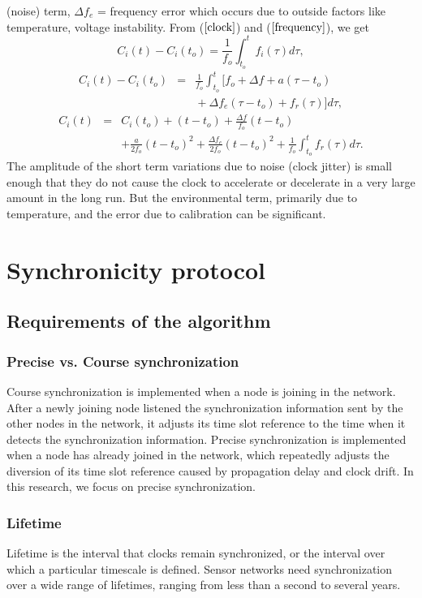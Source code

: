 \documentclass[journal]{IEEEtran}
\begin{document}
(noise) term, \newline $\Delta f_e$ = frequency error which occurs
due to outside factors like temperature, voltage instability. \newline
From ($\ref{clock}$) and
($\ref{frequency}$), we get
\begin{equation}
C_i(t) - C_i(t_o) = \frac{1}{f_o} \int^{t}_{t_o}f_i(\tau)d\tau ,
\end{equation}
\begin{eqnarray*}
C_i(t) - C_i(t_o) & = & \frac{1}{f_o} \int^{t}_{t_o}{[f_o + \Delta f + a(\tau-t_o)  } \\
 &  & {} + \Delta f_e(\tau-t_o) + f_r(\tau)]d\tau ,
\label{fasika}
\end{eqnarray*}
\begin{eqnarray*}
C_i(t) & = & C_i(t_o) + (t-t_o) +\frac{\Delta f}{f_o}(t-t_o) \\
& & + \frac{a}{2f_o}(t-t_o)^2 + \frac{\Delta f_e}{2f_o}(t-t_o)^2 +
\frac{1}{f_o}\int^{t}_{t_o}{f_r(\tau)d\tau} .
\end{eqnarray*}
The amplitude of the short term variations due to noise (clock
jitter) is small enough that they do not cause the clock to
accelerate or decelerate in a very large amount in the long run. But
the environmental term, primarily due to temperature, and the error
due to calibration can be significant. 
\section{\textbf{Synchronicity protocol}}
\subsection{\textbf{Requirements of the algorithm}}
\subsubsection{\textbf{Precise vs. Course synchronization}}Course synchronization
is implemented when a node is joining in the network. After a newly joining node listened the synchronization information sent by 
the other nodes in the network, it adjusts its time slot reference to the time when it detects the synchronization information. Precise synchronization is implemented when a node has already joined in the network, which repeatedly adjusts the diversion of its time slot reference caused by propagation delay and clock drift. In this research, we focus on precise synchronization.
\subsubsection{\textbf{Lifetime}} Lifetime is the interval that clocks
remain synchronized, or the interval over which a particular
timescale is defined. Sensor networks need synchronization over a
wide range of lifetimes, ranging from less than a second to several
years.
\end{document}
